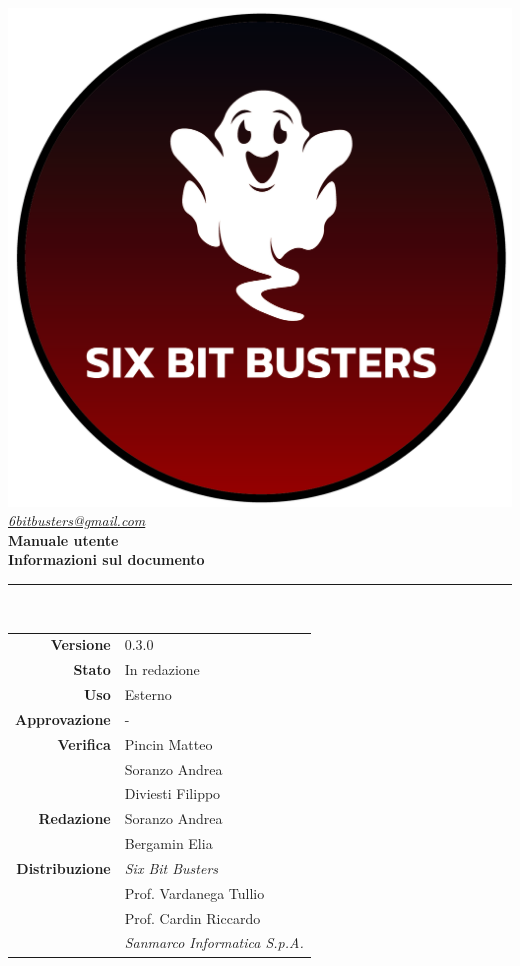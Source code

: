 \thispagestyle{empty}
\renewcommand{\arraystretch}{1.3}


\begin{titlepage}
	\begin{center}
		
	\includegraphics[scale = 0.6]{template/images/logo-circle.png}
	\\[0.8cm]
	\href{mailto:6bitbusters@gmail.com}		      	
	{\large{\textit{6bitbusters@gmail.com} } }\\[0.8cm]
	
	\Huge \textbf{Manuale utente} \\[0.5cm]

	\large \textbf{Informazioni sul documento} \\
	\rule{0.6\textwidth}{0.4pt}
	\\[0.5cm]
	\begin{tabular}{r|l}
		\textbf{Versione} & 0.3.0\\
		\textbf{Stato} & In redazione\\
		\textbf{Uso} & Esterno\\                         
		\textbf{Approvazione} & -\\                      
		\textbf{Verifica} & Pincin Matteo\\  & Soranzo Andrea\\ & Diviesti Filippo\\                       
		\textbf{Redazione} & Soranzo Andrea\\ & Bergamin Elia\\
		\textbf{Distribuzione} & \textit{Six Bit Busters} \\ & Prof. Vardanega Tullio \\ & Prof. Cardin Riccardo \\ & \textit{Sanmarco Informatica S.p.A.}
	\end{tabular}	
	\\[0.8cm]


\end{center}
\end{titlepage}
